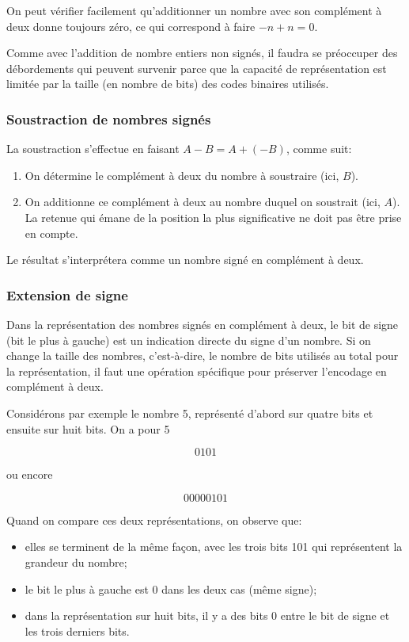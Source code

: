 \documentclass[11pt]{article}
\begin{document}
On peut vérifier facilement qu'additionner un nombre avec son
complément à deux donne toujours zéro, ce qui correspond à faire \(-n + n
= 0\).

Comme avec l'addition de nombre entiers non signés, il faudra se
préoccuper des débordements qui peuvent survenir parce que la capacité
de représentation est limitée par la taille (en nombre de bits) des
codes binaires utilisés.

\subsubsection{Soustraction de nombres signés}
\label{sec:orgf91900c}

La soustraction s'effectue en faisant \(A - B = A + (-B)\), comme suit:

\begin{enumerate}
\item On détermine le complément à deux du nombre à soustraire (ici, \(B\)).
\item On additionne ce complément à deux au nombre duquel on soustrait  (ici, \(A\)). La
retenue qui émane de la position la plus significative ne doit pas
être prise en compte.
\end{enumerate}

Le résultat s'interprétera comme un nombre signé en complément à deux. 

\subsubsection{Extension de signe}
\label{sec:orga5c6b02}

Dans la représentation des nombres signés en complément à deux, le bit
de signe (bit le plus à gauche) est un indication directe du signe
d'un nombre. Si on change la taille des nombres, c'est-à-dire, le nombre
de bits utilisés au total pour la représentation, il faut une
opération spécifique pour préserver l'encodage en complément à deux. 

Considérons par exemple le nombre 5, représenté d'abord sur quatre
bits et ensuite sur huit bits. On a pour 5 

$$ 0101 $$

ou encore 

$$ 00000101 $$

Quand on compare ces deux représentations, on observe que: 

\begin{itemize}
\item elles se terminent de la même façon, avec les trois bits 101 qui
représentent la grandeur du nombre;
\item le bit le plus à gauche est 0 dans les deux cas (même signe);
\item dans la représentation sur huit bits, il y a des bits 0 entre le bit
de signe et les trois derniers bits.
\end{itemize}
\end{document}
